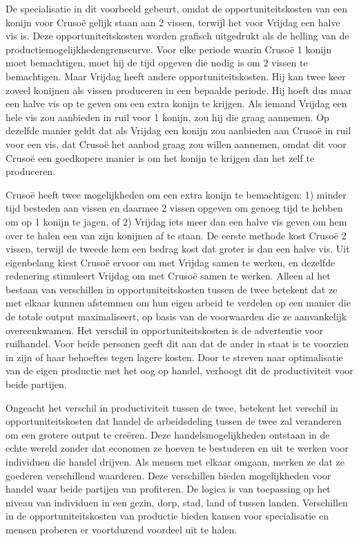 \documentclass[
  a5paper,
  smalldemyvopaper,11pt,twoside,onecolumn,openright,extrafontsizes,
hidelinks]{memoir}
\begin{document}
De specialisatie in dit voorbeeld gebeurt, omdat de opportuniteitskosten
van een konijn voor Crusoë gelijk staan aan 2 vissen, terwijl het voor
Vrijdag een halve vis is. Deze opportuniteitskosten worden grafisch
uitgedrukt als de helling van de productiemogelijkhedengrenscurve. Voor
elke periode waarin Crusoë 1 konijn moet bemachtigen, moet hij de tijd
opgeven die nodig is om 2 vissen te bemachtigen. Maar Vrijdag heeft
andere opportuniteitskosten. Hij kan twee keer zoveel konijnen als
vissen produceren in een bepaalde periode. Hij hoeft dus maar een halve
vis op te geven om een extra konijn te krijgen. Als iemand Vrijdag een
hele vis zou aanbieden in ruil voor 1 konijn, zou hij die graag
aannemen. Op dezelfde manier geldt dat als Vrijdag een konijn zou
aanbieden aan Crusoë in ruil voor een vis, dat Crusoë het aanbod graag
zou willen aannemen, omdat dit voor Crusoë een goedkopere manier is om
het konijn te krijgen dan het zelf te produceren.

Crusoë heeft twee mogelijkheden om een extra konijn te bemachtigen: 1)
minder tijd besteden aan vissen en daarmee 2 vissen opgeven om genoeg
tijd te hebben om op 1 konijn te jagen, of 2) Vrijdag iets meer dan een
halve vis geven om hem over te halen een van zijn konijnen af te staan.
De eerste methode kost Crusoë 2 vissen, terwijl de tweede hem een bedrag
kost dat groter is dan een halve vis. Uit eigenbelang kiest Crusoë
ervoor om met Vrijdag samen te werken, en dezelfde redenering stimuleert
Vrijdag om met Crusoë samen te werken. Alleen al het bestaan van
verschillen in opportuniteitskosten tussen de twee betekent dat ze met
elkaar kunnen afstemmen om hun eigen arbeid te verdelen op een manier
die de totale output maximaliseert, op basis van de voorwaarden die ze
aanvankelijk overeenkwamen. Het verschil in opportuniteitskosten is de
advertentie voor ruilhandel. Voor beide personen geeft dit aan dat de
ander in staat is te voorzien in zijn of haar behoeftes tegen lagere
kosten. Door te streven naar optimalisatie van de eigen productie met
het oog op handel, verhoogt dit de productiviteit voor beide partijen.

Ongeacht het verschil in productiviteit tussen de twee, betekent het
verschil in opportuniteitskosten dat handel de arbeidsdeling tussen de
twee zal veranderen om een grotere output te creëren. Deze
handelsmogelijkheden ontstaan in de echte wereld zonder dat economen ze
hoeven te bestuderen en uit te werken voor individuen die handel
drijven. Als mensen met elkaar omgaan, merken ze dat ze goederen
verschillend waarderen. Deze verschillen bieden mogelijkheden voor
handel waar beide partijen van profiteren. De logica is van toepassing
op het niveau van individuen in een gezin, dorp, stad, land of tussen
landen. Verschillen in de opportuniteitskosten van productie bieden
kansen voor specialisatie en mensen proberen er voortdurend voordeel uit
te halen.
\end{document}
